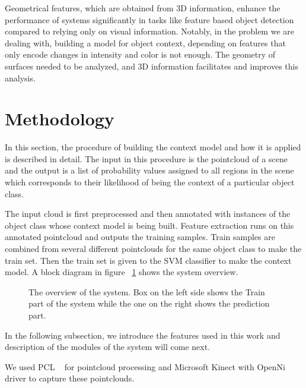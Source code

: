 Geometrical features, which are obtained from 3D information, enhance the performance of systems significantly in tasks like feature 
based object detection compared to relying only on visual information. 
Notably, in the problem we are dealing with, building a model for object context, depending on features that only encode changes in intensity and color is not enough. The geometry of surfaces needed to be analyzed, and 3D information facilitates and improves this analysis.



\section{Methodology}
\label{Implementation.sec}

In this section, the procedure of building the context model and how it is applied is described in detail. 
The input in this procedure is the pointcloud of a scene and the output is a list of probability values assigned to all regions in
the scene which corresponds to their likelihood of being the context of a particular object class. 


The input cloud is first preprocessed and then annotated with instances of the object class whose context model is being built. 
Feature extraction runs on this annotated pointcloud and outputs the training samples. Train samples are combined from several different pointclouds for the same object class to make the train set. 
Then the train set is given to the SVM classifier to make the context model. A block diagram in figure ~\ref{SystemOverview.figure} shows 
the system overview.

\begin{figure}[t]
  \caption[System Overview]
  {The overview of the system. Box on the left side shows the Train part of the system while the one on the right shows the prediction part.}
  \label{SystemOverview.figure}
\end{figure}

In the following subsection, we introduce the features used in this work and description of the modules of the system 
will come next.

We used PCL ~\cite{Rusu_ICRA2011_PCL} for pointcloud processing and Microsoft Kinect with OpenNi driver to capture these pointclouds.

